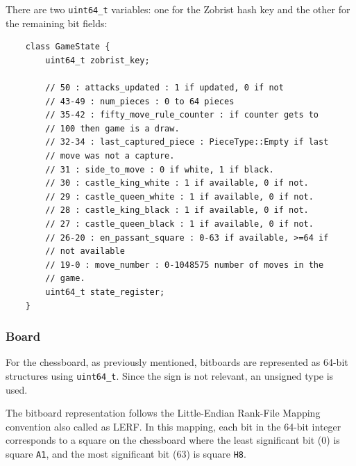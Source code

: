 \noindent There are two \texttt{uint64\_t} variables: one for the Zobrist hash key and the other for the remaining bit fields:

\begin{lstlisting}
    class GameState {
        uint64_t zobrist_key;

        // 50 : attacks_updated : 1 if updated, 0 if not
        // 43-49 : num_pieces : 0 to 64 pieces
        // 35-42 : fifty_move_rule_counter : if counter gets to 
        // 100 then game is a draw.
        // 32-34 : last_captured_piece : PieceType::Empty if last
        // move was not a capture.
        // 31 : side_to_move : 0 if white, 1 if black.
        // 30 : castle_king_white : 1 if available, 0 if not.
        // 29 : castle_queen_white : 1 if available, 0 if not.
        // 28 : castle_king_black : 1 if available, 0 if not.
        // 27 : castle_queen_black : 1 if available, 0 if not.
        // 26-20 : en_passant_square : 0-63 if available, >=64 if
        // not available
        // 19-0 : move_number : 0-1048575 number of moves in the 
        // game.
        uint64_t state_register;
    }
\end{lstlisting}

\subsubsection{Board}

For the chessboard, as previously mentioned, bitboards are represented as 64-bit structures using \texttt{uint64\_t}. Since the sign is not relevant, an unsigned type is used.

\vspace{1em}

\noindent The bitboard representation follows the Little-Endian Rank-File Mapping convention also called as LERF. In this mapping, each bit in the 64-bit integer corresponds to a square on the chessboard where the least significant bit (0) is square \texttt{A1}, and the most significant bit (63) is square \texttt{H8}.

